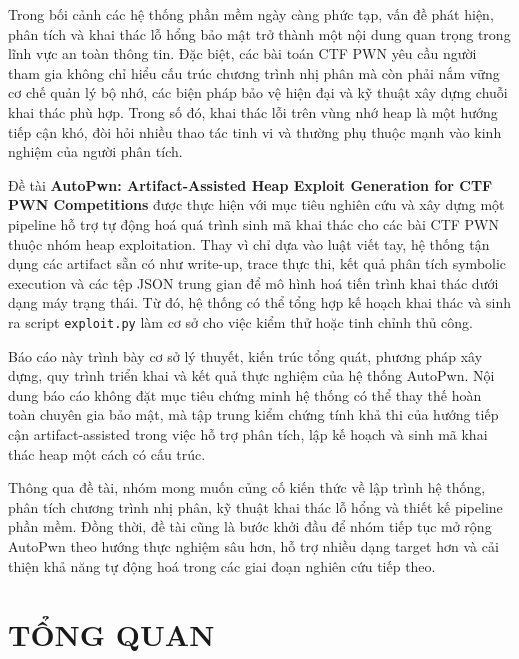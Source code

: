 \documentclass[final]{hcmuitthesis}
\begin{document}
Trong bối cảnh các hệ thống phần mềm ngày càng phức tạp, vấn đề phát hiện, phân tích và khai thác lỗ hổng bảo mật trở thành một nội dung quan trọng trong lĩnh vực an toàn thông tin. Đặc biệt, các bài toán CTF PWN yêu cầu người tham gia không chỉ hiểu cấu trúc chương trình nhị phân mà còn phải nắm vững cơ chế quản lý bộ nhớ, các biện pháp bảo vệ hiện đại và kỹ thuật xây dựng chuỗi khai thác phù hợp. Trong số đó, khai thác lỗi trên vùng nhớ heap là một hướng tiếp cận khó, đòi hỏi nhiều thao tác tinh vi và thường phụ thuộc mạnh vào kinh nghiệm của người phân tích.

Đề tài \textbf{AutoPwn: Artifact-Assisted Heap Exploit Generation for CTF PWN Competitions} được thực hiện với mục tiêu nghiên cứu và xây dựng một pipeline hỗ trợ tự động hoá quá trình sinh mã khai thác cho các bài CTF PWN thuộc nhóm heap exploitation. Thay vì chỉ dựa vào luật viết tay, hệ thống tận dụng các artifact sẵn có như write-up, trace thực thi, kết quả phân tích symbolic execution và các tệp JSON trung gian để mô hình hoá tiến trình khai thác dưới dạng máy trạng thái. Từ đó, hệ thống có thể tổng hợp kế hoạch khai thác và sinh ra script \texttt{exploit.py} làm cơ sở cho việc kiểm thử hoặc tinh chỉnh thủ công.

Báo cáo này trình bày cơ sở lý thuyết, kiến trúc tổng quát, phương pháp xây dựng, quy trình triển khai và kết quả thực nghiệm của hệ thống AutoPwn. Nội dung báo cáo không đặt mục tiêu chứng minh hệ thống có thể thay thế hoàn toàn chuyên gia bảo mật, mà tập trung kiểm chứng tính khả thi của hướng tiếp cận artifact-assisted trong việc hỗ trợ phân tích, lập kế hoạch và sinh mã khai thác heap một cách có cấu trúc.

Thông qua đề tài, nhóm mong muốn củng cố kiến thức về lập trình hệ thống, phân tích chương trình nhị phân, kỹ thuật khai thác lỗ hổng và thiết kế pipeline phần mềm. Đồng thời, đề tài cũng là bước khởi đầu để nhóm tiếp tục mở rộng AutoPwn theo hướng thực nghiệm sâu hơn, hỗ trợ nhiều dạng target hơn và cải thiện khả năng tự động hoá trong các giai đoạn nghiên cứu tiếp theo.

\clearpage

\chapter{TỔNG QUAN}
\end{document}
